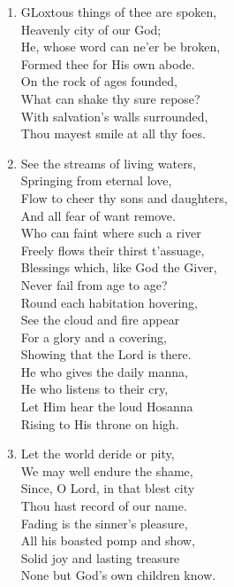 \documentclass[11pt,a4paper]{article}
\begin{document}
\begin{enumerate}
    \item GLoxtous things of thee are spoken, \\
        Heavenly city of our God; \\
        He, whose word can ne'er be broken, \\
        Formed thee for His own abode. \\
        On the rock of ages founded, \\
        What can shake thy sure repose? \\
        With salvation's walls surrounded, \\
        Thou mayest smile at all thy foes.

    \item See the streams of living waters, \\
        Springing from eternal love, \\
        Flow to cheer thy sons and daughters, \\
        And all fear of want remove. \\
        Who can faint where such a river \\
        Freely flows their thirst t'assuage, \\
        Blessings which, like God the Giver, \\
        Never fail from age to age? \\
        Round each habitation hovering, \\
        See the cloud and fire appear \\
        For a glory and a covering, \\
        Showing that the Lord is there. \\
        He who gives the daily manna, \\
        He who listens to their cry, \\
        Let Him hear the loud Hosanna \\
        Rising to His throne on high.

    \item Let the world deride or pity, \\
        We may well endure the shame, \\
        Since, O Lord, in that blest city \\
        Thou hast record of our name. \\
        Fading is the sinner's pleasure, \\
        All his boasted pomp and show, \\
        Solid joy and lasting treasure \\
        None but God's own children know.

\end{enumerate}
\end{document}
